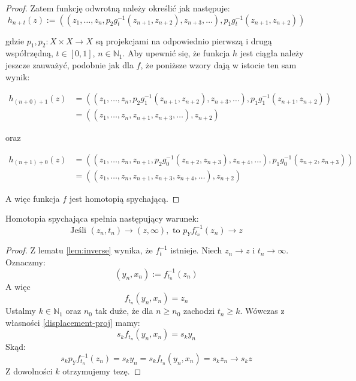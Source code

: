 \begin{thm}
\begin{proof}
    Zatem funkcję odwrotną należy określić jak następuje:
    \[h_{n+t}(z) := ((z_1, \ldots, z_n, p_2 g_t^{-1}(z_{n+1}, z_{n+2}), z_{n+3}, \ldots), p_1 g_t^{-1}(z_{n+1}, z_{n+2}))\]
    
    gdzie $p_1, p_2:  X \times X \rightarrow X$ są projekcjami na odpowiednio pierwszą i drugą współrzędną, $t \in [0,1]$, $n \in \mathbb{N}_1$. Aby upewnić się, że funkcja $h$ jest ciągła należy jeszcze zauważyć, podobnie jak dla $f$, że poniższe wzory dają w istocie ten sam wynik:
    
    \begin{align*}
    h_{(n+0)+1}(z) &= ((z_1, \ldots, z_n, p_2 g_1^{-1}(z_{n+1}, z_{n+2}), z_{n+3}, \ldots), p_1 g_1^{-1}(z_{n+1}, z_{n+2})) \\
    &= ((z_1, \ldots, z_n, z_{n+1}, z_{n+3}, \ldots), z_{n+2})
    \end{align*}
    
    oraz
    
    \begin{align*}
    h_{(n+1)+0}(z) &= ((z_1, \ldots, z_n, z_{n+1}, p_2 g_0^{-1}(z_{n+2}, z_{n+3}), z_{n+4}, \ldots), p_1 g_0^{-1}(z_{n+2}, z_{n+3})) \\
    &= ((z_1, \ldots, z_n, z_{n+1}, z_{n+3}, z_{n+4}, \ldots), z_{n+2})
    \end{align*}

    A więc funkcja $f$ jest homotopią spychającą.
  \end{proof}
\end{thm}


\begin{prop}
  Homotopia spychająca spełnia następujący warunek:
  \[\mbox{Jeśli } (z_n, t_n) \rightarrow (z, \infty), \mbox{ to } p_Y f_{t_n}^{-1}(z_n) \rightarrow z\]
  \begin{proof}
    Z lematu \ref{lem:inverse} wynika, że $f_t^{-1}$ istnieje.
    Niech $z_n \rightarrow z$ i $t_n \rightarrow \infty$. Oznaczmy:
    \[(y_n, x_n) := f_{t_n}^{-1}(z_n)\]
    A więc
    \[f_{t_n}(y_n, x_n) = z_n\]
    Ustalmy $k \in \mathbb{N}_1$ oraz $n_0$ tak duże, że dla $n \geq n_0$ zachodzi $t_n \geq k$. Wówczas z własności \ref{displacement-proj} mamy:
    \[s_k f_{t_n}(y_n, x_n) = s_k y_n\]
    Skąd:
    \[s_k p_Y f_{t_n}^{-1}(z_n) = s_k y_n = s_k f_{t_n}(y_n, x_n) = s_k z_n \rightarrow s_k z\]
    Z dowolności $k$ otrzymujemy tezę.
  \end{proof}
\end{prop}

